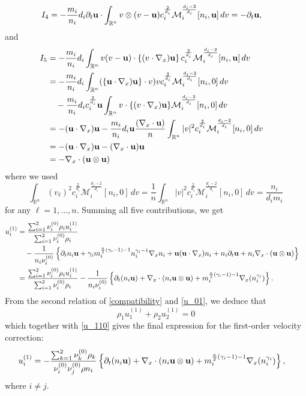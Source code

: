\documentclass[10pt,reqno]{amsart}
\numberwithin{equation}{section}
\newcommand{\R}{\mathbb R}
\newcommand{\pa}{\partial}
\newcommand{\intr}{\int_{\R^n}}
\begin{document}
\begin{align*}
I_4&=-\frac{m_i}{n_i}d_i\pa_t {\bf{u}}\cdot \intr v\otimes (v-{\bf{u}})  c_i^{\frac{2}{d_i}}\mathcal{M}_i^{\frac{d_i-2}{d_i}}[n_i, {\bf{u}}]    \,dv=-\pa_t {\bf{u}},
\end{align*}
and
\begin{align*}
I_5&=-\frac{m_i}{n_i}d_i \intr v   (v-{\bf{u}}) \cdot  \left\{ ( v \cdot \nabla_x) {\bf{u}}  \right\} c_i^{\frac{2}{d_i}}\mathcal{M}_i^{\frac{d_i-2}{d_i}}[n_i, {\bf{u}}]  \, dv\cr 
&=-\frac{m_i}{n_i}d_i  \intr (\{ {\bf{u}}\cdot\nabla_x) {\bf{u}}\} \cdot v)  v   c_i^{\frac{2}{d_i}} \mathcal{M}_i^{\frac{d_i-2}{d_i}}[n_i, 0]  \,dv\cr 
&\quad -\frac{m_i}{n_i}d_i c_i^{\frac 2{d_i}} {\bf{u}} \intr v \cdot \{ (v \cdot \nabla_x) {\bf{u}} \}  \mathcal{M}_i^{\frac{d_i-2}{d_i}}[n_i, 0]  \,dv \cr
&=- ( {\bf{u}}\cdot\nabla_x) {\bf{u}}   -\frac{m_i}{n_i}d_i {\bf{u}}   \frac {(\nabla_x \cdot {\bf{u}})}n\intr |v|^2    c_i^{\frac{2}{d_i}}  \mathcal{M}_i^{\frac{d_i-2}{d_i}}[n_i, 0]  \,dv\cr 
&=- ( {\bf{u}}\cdot\nabla_x) {\bf{u}} - (\nabla_x\cdot {\bf{u}}) {\bf{u}}\cr 
&=-\nabla_x \cdot ({\bf{u}}\otimes {\bf{u}})
\end{align*}
where we used
$$
 \intr (v_\ell)^2    c_i^{\frac{2}{d_i}}  \mathcal{M}_i^{\frac{d_i-2}{d_i}}[n_i, 0]  \,dv =  \frac 1n\intr |v|^2    c_i^{\frac{2}{d_i}}  \mathcal{M}_i^{\frac{d_i-2}{d_i}}[n_i, 0]  \,dv =\frac{n_i}{d_i m_i}
$$
for any $\ell = 1,\dots, n$. 
Summing all five contributions, we get
\begin{align}\label{u_110}
\begin{aligned}
u_i^{(1)}&=\frac{ \sum_{i=1}^2\nu_i^{(0)} \rho_iu_i^{(1)}}{\sum_{i=1}^2\nu_i^{(0)} \rho_i} \cr
&\quad -\frac{1}{n_i\nu_{i}^{(0)}} \left\{     \pa_tn_i  {\bf{u}}+\gamma_im_i^{\frac n2(\gamma_i - 1)-1} n_i^{\gamma_i-1}  \nabla_x n_i + {\bf{u}}  ({\bf{u}} \cdot \nabla_x) n_i +n_i\pa_t {\bf{u}}+n_i\nabla_x\cdot ({\bf{u}}\otimes {\bf{u}}) \right\}\cr 
&=\frac{ \sum_{i=1}^2\nu_i^{(0)} \rho_iu_i^{(1)}}{\sum_{i=1}^2\nu_i^{(0)} \rho_i}-\frac{1}{n_i\nu_{i}^{(0)}}\left\{     \pa_t(n_i {\bf{u}}) +\nabla_x\cdot (n_i {\bf{u}}\otimes {\bf{u}}) + m_i^{\frac n2(\gamma_i - 1)-1}  \nabla_x (n_i^{\gamma_i}) \right\}.
\end{aligned}
\end{align}
From the second relation of \eqref{compatibility} and \eqref{u_01}, we deduce that 
$$
\rho_1u_1^{(1)}+\rho_2u_2^{(1)}=0
$$
which together with \eqref{u_110} gives
the final expression for the first-order velocity correction:
\begin{align}\label{u_11}
\begin{aligned}
u_i^{(1)}&=-\frac{\sum_{k=1}^2\nu_k^{(0)}\rho_k}{\nu_{i}^{(0)}\nu_{j}^{(0)}\rho n_i}\left\{     \pa_t(n_i {\bf{u}}) +\nabla_x\cdot (n_i {\bf{u}}\otimes {\bf{u}}) + m_i^{\frac n2(\gamma_i - 1)-1}  \nabla_x (n_i^{\gamma_i}) \right\},
\end{aligned}
\end{align}
where $i\neq j$.
\end{document}
